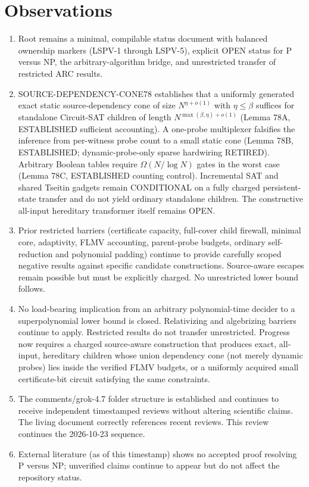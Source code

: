 \documentclass[11pt]{article}
\begin{document}
\section{Observations}
\begin{enumerate}
\item Root  remains a minimal, compilable status document with balanced ownership markers (LSPV-1 through LSPV-5), explicit OPEN status for P versus NP, the arbitrary-algorithm bridge, and unrestricted transfer of restricted ARC results.
\item SOURCE-DEPENDENCY-CONE78 establishes that a uniformly generated exact static source-dependency cone of size $N^{\eta+o(1)}$ with $\eta\le\beta$ suffices for standalone Circuit-SAT children of length $N^{\max(\beta,\eta)+o(1)}$ (Lemma 78A, ESTABLISHED sufficient accounting). A one-probe multiplexer falsifies the inference from per-witness probe count to a small static cone (Lemma 78B, ESTABLISHED; dynamic-probe-only sparse hardwiring RETIRED). Arbitrary Boolean tables require $\Omega(N/\log N)$ gates in the worst case (Lemma 78C, ESTABLISHED counting control). Incremental SAT and shared Tseitin gadgets remain CONDITIONAL on a fully charged persistent-state transfer and do not yield ordinary standalone children. The constructive all-input hereditary transformer itself remains OPEN.
\item Prior restricted barriers (certificate capacity, full-cover child firewall, minimal core, adaptivity, FLMV accounting, parent-probe budgets, ordinary self-reduction and polynomial padding) continue to provide carefully scoped negative results against specific candidate constructions. Source-aware escapes remain possible but must be explicitly charged. No unrestricted lower bound follows.
\item No load-bearing implication from an arbitrary polynomial-time decider to a superpolynomial lower bound is closed. Relativizing and algebrizing barriers continue to apply. Restricted results do not transfer unrestricted. Progress now requires a charged source-aware construction that produces exact, all-input, hereditary children whose union dependency cone (not merely dynamic probes) lies inside the verified FLMV budgets, or a uniformly acquired small certificate-bit circuit satisfying the same constraints.
\item The comments/grok-4.7 folder structure is established and continues to receive independent timestamped reviews without altering scientific claims. The living document correctly references recent reviews. This review continues the 2026-10-23 sequence.
\item External literature (as of this timestamp) shows no accepted proof resolving P versus NP; unverified claims continue to appear but do not affect the repository status.
\end{enumerate}
\end{document}
